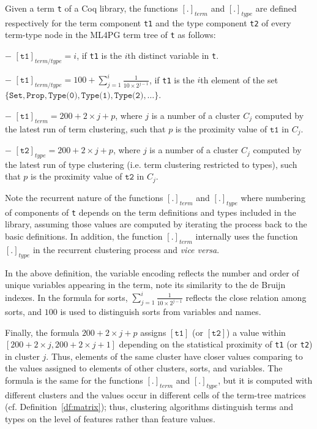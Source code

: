 \begin{definition}\label{def:funterm}
Given a term  \lstinline?t? of a Coq library, the functions $[.]_{term}$ and $[.]_{type}$ are defined respectively for the term component \lstinline?t1?
and the type component \lstinline?t2? of every term-type node in the ML4PG term tree of \lstinline?t? as follows:

$-$ $[\texttt{t1}]_{term/type}=i$, if \lstinline?t1? is the $i$th distinct variable in \lstinline?t?.

$-$ $[\texttt{t1}]_{term/type}=100+\sum_{j=1}^i\frac{1}{10\times 2^{j-1}}$, if \lstinline?t1? is the $i$th element of the set\\ $\{\texttt{Set},\texttt{Prop},\texttt{Type(0)},
\texttt{Type(1)}, \texttt{Type(2)},\ldots\}$.

$-$ $[\texttt{t1}]_{term}=200+2\times j + p$, where $j$ is a number of a cluster $C_j$ computed by the latest run of term clustering,
such that $p$ is the proximity value of $\texttt{t1}$ in $C_j$.

$-$ $[\texttt{t2}]_{type}=200+2\times j + p$, where $j$ is a number of a cluster $C_j$ computed by the latest run of type clustering (i.e. term clustering restricted to types),
such that $p$ is the proximity value of $\texttt{t2}$ in $C_j$.
\end{definition}


Note the recurrent nature of the functions $[.]_{term}$ and $[.]_{type}$ where numbering of components of \lstinline?t? depends on the term definitions
and types included in the library, assuming those values are computed by iterating the process back to the basic definitions.  In addition, the function $[.]_{term}$ internally uses the function $[.]_{type}$ in the recurrent clustering
process and \emph{vice versa}.

In the above definition,
the variable encoding reflects the number and order of unique variables appearing in the term, note its similarity to the de Bruijn indexes.
In the formula for sorts, $\sum_{j=1}^i\frac{1}{10\times 2^{j-1}}$ reflects the close relation among sorts, and
$100$ is used to  distinguish sorts from variables and names.

Finally, the formula $200+2\times j + p$ assigns $[\texttt{t1}]$ (or $[\texttt{t2}]$) a value within $[200+2\times j,200+2\times j+1]$ depending on the
statistical proximity of \lstinline?t1? (or \lstinline?t2?) in cluster $j$. Thus, elements of the same cluster have closer values comparing to the values
assigned to elements of other clusters, sorts, and variables. The formula is the same for the functions $[.]_{term}$ and $[.]_{type}$, but it is computed with different
clusters and the values
occur in different cells of the term-tree matrices (cf. Definition~\ref{df:matrix}); thus, clustering algorithms distinguish terms and types on the level of features rather than feature values.

